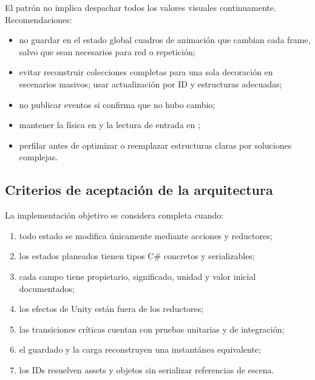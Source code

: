 El patrón no implica despachar todos los valores visuales continuamente. Recomendaciones:

\begin{itemize}
  \item no guardar en el estado global cuadros de animación que cambian cada frame, salvo que sean necesarios para red o repetición;
  \item evitar reconstruir colecciones completas para una sola decoración en escenarios masivos; usar actualización por ID y estructuras adecuadas;
  \item no publicar eventos si  confirma que no hubo cambio;
  \item mantener la física en  y la lectura de entrada en ;
  \item perfilar antes de optimizar o reemplazar estructuras claras por soluciones complejas.
\end{itemize}

\subsection{Criterios de aceptación de la arquitectura}

La implementación objetivo se considera completa cuando:

\begin{enumerate}
  \item todo estado se modifica únicamente mediante acciones y reductores;
  \item los estados planeados tienen tipos C\# concretos y serializables;
  \item cada campo tiene propietario, significado, unidad y valor inicial documentados;
  \item los efectos de Unity están fuera de los reductores;
  \item las transiciones críticas cuentan con pruebas unitarias y de integración;
  \item el guardado y la carga reconstruyen una instantánea equivalente;
  \item los IDs resuelven assets y objetos sin serializar referencias de escena.
\end{enumerate}
